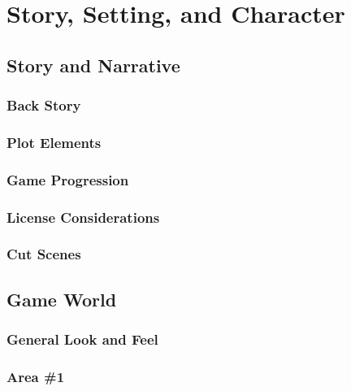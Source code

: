 \documentclass[12pt,titlepage]{article}
\newcounter{subsubsubsection}[subsubsection]
\begin{document}
\section{Story, Setting, and Character}

\subsection{Story and Narrative}

\subsubsection{Back Story}

\subsubsection{Plot Elements}

\subsubsection{Game Progression}

\subsubsection{License Considerations}

\subsubsection{Cut Scenes}




\subsection{Game World}

\subsubsection{General Look and Feel}

\subsubsection{Area \#1}
\end{document}
